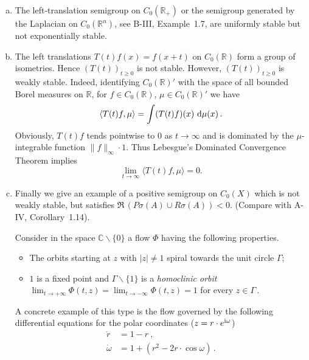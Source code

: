 \begin{example}\label{ex:b4-1.2}
\begin{enumerate}[(a), wide, labelsep=1em, itemindent=\parindent]
\item
The left-translation semigroup on $C_{0}(\mathbb{R}_+)$ or the semigroup generated by the Laplacian on $C_{0}(\mathbb{R}^n)$, see B-III, Example~1.7, are uniformly stable but not exponentially stable.

\item 
The left translations $T(t)f(x) = f(x+t)$ on $C_{0}(\mathbb{R})$ form a group of isometries. 
Hence $(T(t))_{t \geq 0}$ is not stable. 
However, $(T(t))_{t \geq 0}$ is weakly stable. 
Indeed, identifying $C_{0}(\mathbb{R})'$ with the space of all bounded Borel measures on $\mathbb{R}$, for $f \in C_{0}(\mathbb{R})$, $\mu \in C_{0}(\mathbb{R})'$ we have
\[
   \langle T(t)f,\mu \rangle = \int (T(t)f)(x) \, \mathop{}\!\mathrm{d}{\mu}(x)\,.
\]
Obviously, $T(t)f$ tends pointwise to $0$ as $t \to \infty$ and is dominated by the $\mu$-integrable function $\|f\|_\infty \cdot 1$. 
Thus Lebesgue's Dominated Convergence Theorem implies
\[ 
\lim_{t\to\infty} \langle T(t)f,\mu \rangle = 0.
\]

\item 
Finally we give an example of a positive semigroup on $C_{0}(X)$ which is not weakly stable, but satisfies $\Re\,(P\sigma(A) \cup R\sigma(A)) < 0$. (Compare with A-IV, Corollary~1.14).

Consider in the space $\mathbb{C}\backslash\{0\}$ a flow $\Phi$ having the following properties.
\begin{itemize}[-]
	\item 
	The orbits starting at $z$ with $|z| \neq 1$ spiral towards the unit circle $\Gamma$;
	
	\item 
	$1$ is a fixed point and $\Gamma\backslash\{1\}$ is a \emph{homoclinic orbit} \ie
    \\ 
    $\lim_{t\to+\infty} \Phi(t,z) = \lim_{t\to-\infty} \Phi(t,z) = 1$ for every $z \in \Gamma$\,.
\end{itemize}

A concrete example of this type is the flow governed by the following differential equations for the polar coordinates (\ie $z = r\cdot e^{\mathrm{i}\omega}$)
\[
   \begin{aligned}
   \dot{r} &= 1 - r~,\\
   \dot{\omega} &= 1 + (r^2 - 2r\cdot\cos \omega)\,.
   \end{aligned}
\]


\end{enumerate}
\end{example}
